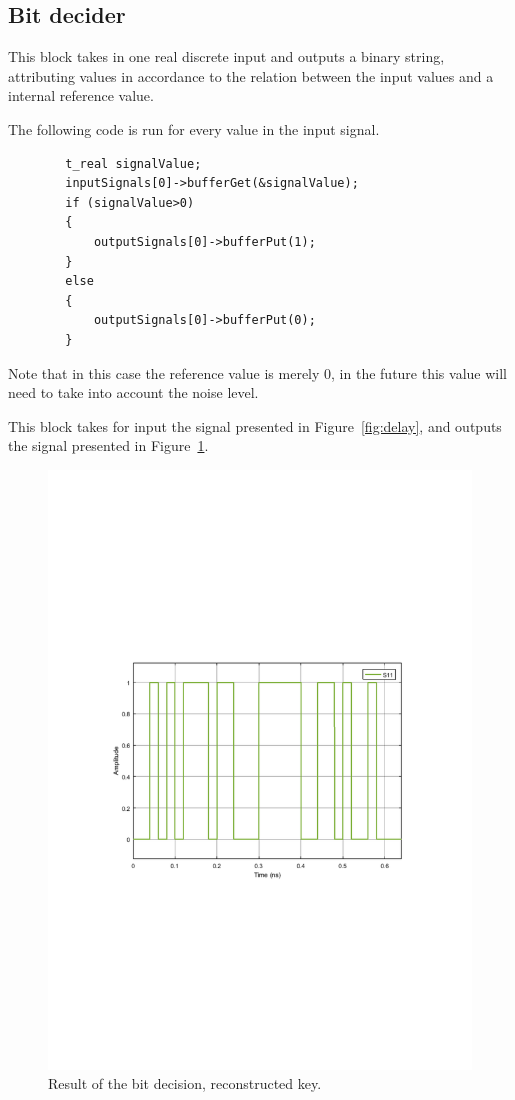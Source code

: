 \documentclass{article}
\begin{document}
\subsection{Bit decider}

This block takes in one real discrete input and outputs a binary string, attributing values in accordance to the relation between the input values and a internal reference value.
\par
The following code is run for every value in the input signal.
\begin{verbatim}
		t_real signalValue;
		inputSignals[0]->bufferGet(&signalValue);
		if (signalValue>0)
		{
			outputSignals[0]->bufferPut(1);
		}
		else
		{
			outputSignals[0]->bufferPut(0);
		}
\end{verbatim}

Note that in this case the reference value is merely 0, in the future this value will need to take into account the noise level.
\par
This block takes for input the signal presented in Figure~\ref{fig:delay}, and outputs the signal presented in Figure~\ref{fig:decision}.

\begin{figure}[H]
\centering
\includegraphics[width=\linewidth, trim= 0mm 100mm 0mm 100mm, clip]{recvkey.pdf}
\caption{Result of the bit decision, reconstructed key.}
\label{fig:decision}
\end{figure}
\end{document}
